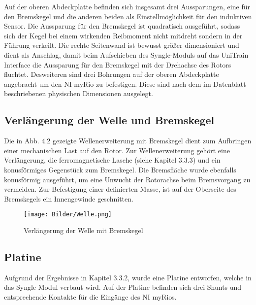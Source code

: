  Auf der oberen Abdeckplatte befinden sich insgesamt drei Aussparungen, eine für den Bremskegel und die anderen beiden als Einstellmöglichkeit für den induktiven Sensor. Die Aussparung für den Bremskegel ist quadratisch ausgeführt, sodass sich der Kegel bei einem wirkenden Reibmoment nicht mitdreht sondern in der Führung verkeilt.\newline
 Die rechte Seitenwand ist bewusst größer dimensioniert und dient als Anschlag, damit beim Aufschieben des Syngle-Moduls auf das UniTrain Interface die Aussparung für den Bremskegel mit der Drehachse des Rotors fluchtet. Desweiteren sind drei Bohrungen auf der oberen Abdeckplatte angebracht um den NI myRio zu befestigen. Diese sind nach dem im Datenblatt beschriebenen physischen Dimensionen ausgelegt.\cite{myriomanual}
 

\subsection{Verlängerung der Welle und Bremskegel}

Die in Abb. 4.2 gezeigte Wellenerweiterung mit Bremskegel dient zum Aufbringen einer mechanischen Last auf den Rotor. Zur Wellenerweiterung gehört eine Verlängerung,  die ferromagnetische Lasche (siehe Kapitel 3.3.3) und ein konusförmiges Gegenstück zum Bremskegel. Die Bremsfläche wurde ebenfalls konusförmig ausgeführt, um eine Unwucht der Rotorachse beim Bremsvorgang zu vermeiden. Zur Befestigung einer definierten Masse, ist auf der Oberseite des Bremskegels ein Innengewinde geschnitten.

\begin{figure}[H]
	\centering
	\texttt{[image: Bilder/Welle.png]} 
	\caption{Verlängerung der Welle mit Bremskegel }
	\label{fig:Verlängerung der Welle mit Bremskegel}

\end{figure}

\subsection{Platine}

Aufgrund der Ergebnisse in Kapitel 3.3.2, wurde eine Platine entworfen, welche in das Syngle-Modul verbaut wird. Auf der Platine befinden sich drei Shunts und entsprechende Kontakte für die Eingänge des NI myRios.


